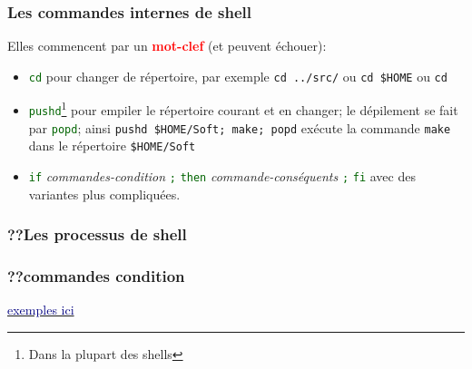 \documentclass[lualatex,11pt,a4paper,svgnames,french]{beamer}
\newcommand{\clbhref}[2]{{\href{https:#1}{{\textcolor{Navy}{#2}}}}}
\newcommand{\clbrougras}[1]{{\textcolor{Red}{\textbf{#1}}}}
\newcommand{\clbshell}[1]{{\textcolor{DarkGreen}{\texttt{#1}}}}
\begin{document}
\begin{frame}\frametitle{Les commandes internes de shell}
  Elles commencent par un \clbrougras{mot-clef} (et peuvent échouer):
  \begin{itemize}
  \item \clbshell{cd} pour changer de répertoire, par exemple
    \texttt{cd ../src/} ou \texttt{cd \$HOME} ou \texttt{cd ~}
    \item \clbshell{pushd}\footnote{Dans la plupart des shells} pour
      empiler le répertoire courant et en changer; le dépilement se
      fait par \clbshell{popd}; ainsi \texttt{pushd \$HOME/Soft; make;
        popd} exécute la commande \texttt{make} dans le répertoire
      \texttt{\$HOME/Soft}
  \item \clbshell{if} \textit{commandes-condition} \clbshell{;}
    \clbshell{then} \textit{commande-conséquents} \clbshell{;}
    \clbshell{fi} avec des variantes plus compliquées.
  \end{itemize}
  
  {}
\end{frame}
\begin{frame}\frametitle{??Les processus de shell}

  
  {}
\end{frame}
\begin{frame}\frametitle{??commandes condition}

  \clbhref{//developpement-informatique.com/article/479/structures-conditionnelles-if-et-case-dans-shell}{exemples ici}
  
  {}
\end{frame}
\end{document}
